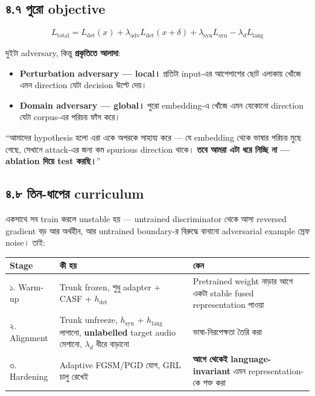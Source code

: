 \documentclass[11pt,a4paper]{article}
\newenvironment{say}{%
  \def\FrameCommand{\textcolor{barcol}{\vrule width 3pt}\hspace{8pt}}%
  \MakeFramed{\advance\hsize-\width \FrameRestore}%
}{\endMakeFramed}
\begin{document}
\subsection*{৪.৭ পুরো objective}

\begin{equation*}
L_\mathrm{total} = L_\mathrm{det}(x)
+ \lambda_\mathrm{adv} L_\mathrm{det}(x + \delta)
+ \lambda_\mathrm{syn} L_\mathrm{syn}
- \lambda_d L_\mathrm{lang}
\end{equation*}

দুইটা adversary, কিন্তু \textbf{প্রকৃতিতে আলাদা}:

\begin{itemize}
\item \textbf{Perturbation adversary --- local।} প্রতিটা input-এর আশেপাশের ছোট
      এলাকায় খোঁজে এমন direction যেটা decision উল্টে দেয়।
\item \textbf{Domain adversary --- global।} পুরো embedding-এ খোঁজে এমন যেকোনো
      direction যেটা corpus-এর পরিচয় ফাঁস করে।
\end{itemize}

\begin{say}
``আমাদের hypothesis হলো এরা একে অপরকে সাহায্য করে --- যে embedding থেকে ভাষার
পরিচয় মুছে গেছে, সেখানে attack-এর জন্য কম spurious direction থাকে।
\textbf{তবে আমরা এটা ধরে নিচ্ছি না --- ablation দিয়ে test করছি।}''
\end{say}

\subsection*{৪.৮ তিন-ধাপের curriculum}

একসাথে সব train করলে unstable হয় --- untrained discriminator থেকে আসা reversed
gradient বড় আর অর্থহীন, আর untrained boundary-র বিরুদ্ধে বানানো adversarial
example স্রেফ noise। তাই:

\begin{center}
\begin{tabularx}{\textwidth}{@{}l >{\raggedright\arraybackslash}X >{\raggedright\arraybackslash}X@{}}
\toprule
\textbf{Stage} & \textbf{কী হয়} & \textbf{কেন} \\
\midrule
১. Warm-up &
Trunk frozen, শুধু adapter + CASF + $h_\mathrm{det}$ &
Pretrained weight নাড়ার আগে একটা stable fused representation পাওয়া \\
২. Alignment &
Trunk unfreeze, $h_\mathrm{syn}$ + $h_\mathrm{lang}$ লাগানো,
\textbf{unlabelled} target audio মেশানো, $\lambda_d$ ধীরে বাড়ানো &
ভাষা-নিরপেক্ষতা তৈরি করা \\
৩. Hardening &
Adaptive FGSM/PGD যোগ, GRL চালু রেখেই &
\textbf{আগে থেকেই language-invariant} এমন representation-কে শক্ত করা \\
\bottomrule
\end{tabularx}
\end{center}
\end{document}
